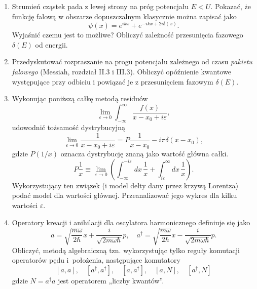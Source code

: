 \documentclass[a4paper,11pt]{article}
\begin{document}
\begin{enumerate}
\item Strumień cząstek pada z lewej strony na próg potencjału $E < U$.
  Pokazać, że funkcję falową w obszarze dopuszczalnym klasycznie można
  zapisać jako
  \begin{equation}
    \label{QM:26}
    \psi( x ) = e^{ ikx } + e^{ -ikx + 2 i \delta( x ) }.
  \end{equation}
  Wyjaśnić czemu jest to możliwe? Obliczyć zależność przesunięcia
  fazowego $\delta( E )$ od energii.

\item Przedyskutować rozpraszanie na progu potencjału zależnego od
  czasu \textit{pakietu falowego} (Messiah, rozdział II.3 i III.3).
  Obliczyć opóźnienie kwantowe występujące przy odbiciu i powiązać je
  z przesunięciem fazowym $\delta( E )$.

\item Wykonując poniższą całkę metodą residuów
  \begin{equation}
    \label{QM:27}
    \lim_{ \varepsilon \to 0 } \int_{ -\infty }^{ \infty } \frac{ f( x ) }{ x - x_{ 0 } + i \varepsilon },
  \end{equation}
  udowodnić tożsamość dystrybucyjną
  \begin{equation}
    \label{QM:28}
    \lim_{ \varepsilon \to 0 } \frac{ 1 }{ x - x_{ 0 } + i \varepsilon } =
    P \frac{ 1 }{ x - x_{ 0 } } - i \pi \delta( x - x_{ 0 } ),
  \end{equation}
  gdzie $P( 1 / x )$ oznacza dystrybucję znaną jako wartość główna
  całki.
  \begin{equation}
    \label{QM:29}
    P \frac{ 1 }{ x } \equiv
    \lim_{ \varepsilon \to 0 } \left( \int_{ -\infty }^{ -i \varepsilon } dx \, \frac{ 1 }{ x }
      + \int_{ i \varepsilon }^{ \infty } dx \, \frac{ 1 }{ x } \right).
  \end{equation}
  Wykorzystujący ten związek (i model delty dany przez krzywą
  Lorentza) podać model dla wartości głównej. Przeanalizować jego
  wykres dla kilku wartości $\varepsilon$.

\item Operatory kreacji i anihilacji dla oscylatora harmonicznego
  definiuje się jako
  \begin{equation}
    \label{QM:30}
    a =
    \sqrt{ \frac{ m \omega }{ 2 \hbar } } x
    + \frac{ i }{ \sqrt{ 2 m \omega \hbar } } p, \quad
    a^{ \dagger } =
    \sqrt{ \frac{ m \omega }{ 2 \hbar } } x
    - \frac{ i }{ \sqrt{ 2 m \omega \hbar } } p.
  \end{equation}
  Obliczyć, metodą algebraiczną tzn. wykorzystując tylko reguły
  komutacji operatorów pędu i~położenia, następujące komutatory
  \begin{equation}
    \label{QM:31}
    [ a, a ], \quad [ a^{ \dagger }, a^{ \dagger } ], \quad [ a, a^{ \dagger } ], \quad
    [ a, N ], \quad [ a^{ \dagger }, N ]
  \end{equation}
  gdzie $N = a^{ \dagger } a$ jest operatorem „liczby kwantów”.


\end{enumerate}
\end{document}
